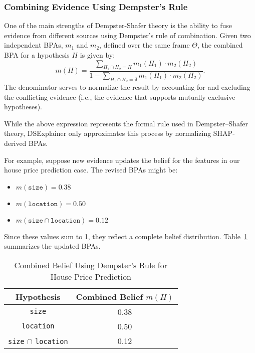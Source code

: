 \documentclass[acmlarge]{acmart}
\begin{document}
\subsubsection{Combining Evidence Using Dempster's Rule}

One of the main strengths of Dempster-Shafer theory is the ability to fuse evidence from different sources using Dempster's rule of combination. Given two independent BPAs, \( m_1 \) and \( m_2 \), defined over the same frame \(\Theta\), the combined BPA for a hypothesis \( H \) is given by:
\[
m(H) = \frac{\sum_{H_1 \cap H_2 = H} m_1(H_1) \cdot m_2(H_2)}{1 - \sum_{H_1 \cap H_2 = \emptyset} m_1(H_1) \cdot m_2(H_2)}.
\]
The denominator serves to normalize the result by accounting for and excluding the conflicting evidence (i.e., the evidence that supports mutually exclusive hypotheses).

While the above expression represents the formal rule used in Dempster--Shafer theory, DSExplainer only approximates this process by normalizing SHAP-derived BPAs.

For example, suppose new evidence updates the belief for the features in our house price prediction case. The revised BPAs might be:
\begin{itemize}
    \item \( m(\texttt{size}) = 0.38 \)
    \item \( m(\texttt{location}) = 0.50 \)
    \item \( m(\texttt{size} \cap \texttt{location}) = 0.12 \)
\end{itemize}
Since these values sum to 1, they reflect a complete belief distribution. Table~\ref{tab:combined_belief} summarizes the updated BPAs.

\begin{table}[H]
    \caption{Combined Belief Using Dempster's Rule for House Price Prediction}
    \label{tab:combined_belief}
    \centering
    \begin{tabular}{|c|c|}
        \hline
        \textbf{Hypothesis} & \textbf{Combined Belief \( m(H) \)} \\
        \hline
        \texttt{size} & 0.38 \\
        \hline
        \texttt{location} & 0.50 \\
        \hline
        \texttt{size} \(\cap\) \texttt{location} & 0.12 \\
        \hline
    \end{tabular}
\end{table}
\end{document}
